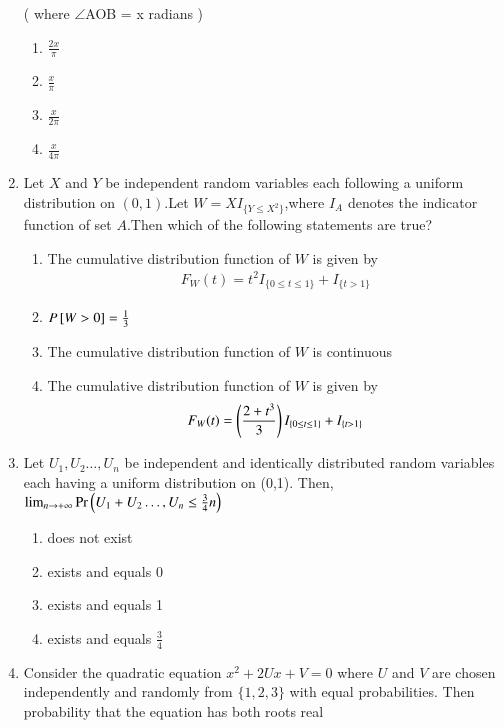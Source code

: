 \begin{enumerate}[label=\thesection.\arabic*.,ref=\thesection.\theenumi]
( where $\angle$AOB = x radians )


    \begin{enumerate}
        \item $\frac{2x}{\pi}$
        \item $\frac{x}{\pi}$
        \item $\frac{x}{2\pi}$
        \item $\frac{x}{4\pi}$
    \end{enumerate}

%
\solution

%
\item Let $X$ and $Y$ be independent random variables each following a uniform distribution on $(0,1)$.Let $W=XI_{\{Y\leq X^2\}}$,where $I_A$ denotes the indicator function of set $A$.Then which of the following statements are true? \\
\begin{enumerate}
\item The cumulative distribution function of $W$ is given by
\begin{align}
  F_W(t)=t^2I_{\{0\leq t \leq 1\}}+ I_{\{t > 1\}}
\end{align}
\item $P{}\left[W>0\right]=\frac{1}{3}$
\item The cumulative distribution function of $W$ is continuous
\item The cumulative distribution function of $W$ is given by
\begin{align}
  F_W(t)=\left(\frac{2+t^3}{3}\right)I_{\{0\leq t \leq 1\}}+ I_{\{t > 1\}}
\end{align}
\end{enumerate}
%
\solution

%
\item Let $U_1,U_2\dots,U_n$ be independent and identically distributed random variables each
having a uniform distribution on (0,1). Then,$\lim_{n \to +\infty} \Pr\left(U_1+U_2\dots,U_n\leq \frac{3}{4}n\right)$
\begin{enumerate}
    \item does not exist
    \item exists and equals 0
    \item exists and equals 1
    \item exists and equals $\frac{3}{4}$
\end{enumerate}
%
\solution

%
\item  Consider the quadratic equation $x^2+2U x+V=0$ where $U$ and $V$ are chosen independently and randomly from $\{1,2,3\}$ with equal probabilities. Then probability that the equation has both roots real

\end{enumerate}
